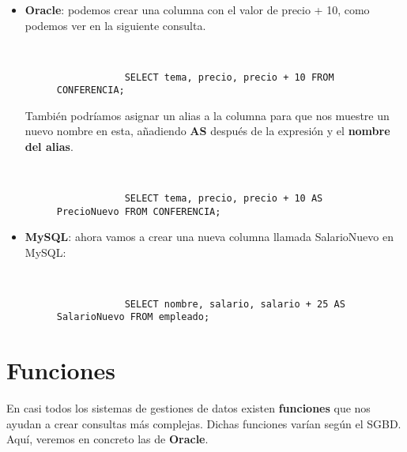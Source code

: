 \begin{itemize}
    \item \textbf{Oracle}: podemos crear una columna con el valor de precio + 10, como podemos ver en la siguiente consulta.

    \begin{figure}[h]
        \begin{tcolorbox}[sharp corners, colback=yellow!30, colframe=white!20]
            \scriptsize
            \begin{verbatim}


            SELECT tema, precio, precio + 10 FROM CONFERENCIA;
            \end{verbatim}
        \end{tcolorbox}
    \end{figure}

    También podríamos asignar un alias a la columna para que nos muestre un nuevo nombre en esta, añadiendo \textbf{AS} después de la expresión y el \textbf{nombre del alias}.

        \begin{figure}[h]
        \begin{tcolorbox}[sharp corners, colback=yellow!30, colframe=white!20]
            \scriptsize
            \begin{verbatim}


            SELECT tema, precio, precio + 10 AS PrecioNuevo FROM CONFERENCIA;
            \end{verbatim}
        \end{tcolorbox}
    \end{figure}

    \item \textbf{MySQL}: ahora vamos a crear una nueva columna llamada SalarioNuevo en MySQL:

    \begin{figure}[H]
        \begin{tcolorbox}[sharp corners, colback=yellow!30, colframe=white!20]
            \scriptsize
            \begin{verbatim}


            SELECT nombre, salario, salario + 25 AS SalarioNuevo FROM empleado;
            \end{verbatim}
        \end{tcolorbox}
    \end{figure}
\end{itemize}

\section{Funciones}
En casi todos los sistemas de gestiones de datos existen \textbf{funciones} que nos ayudan a crear consultas más complejas. Dichas funciones varían según el SGBD. Aquí, veremos en concreto las de \textbf{Oracle}.

